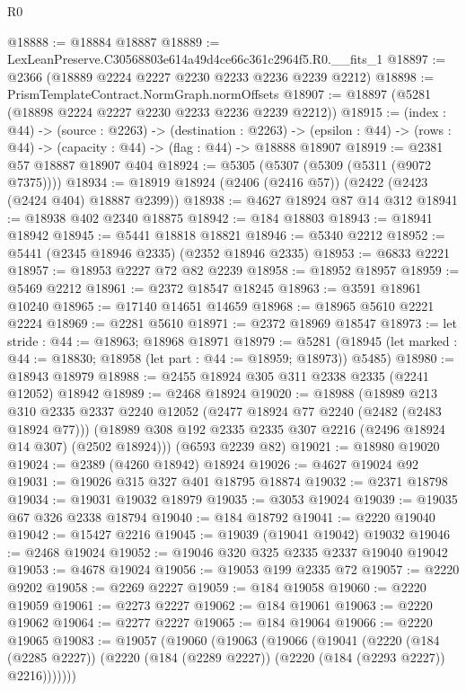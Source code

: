 \begin{lexlean}{R0}
\begin{coremodule}
@18888 := @18884 @18887
@18889 := LexLeanPreserve.C30568803e614a49d4ce66c361c2964f5.R0.__fits_1
@18897 := @2366 (@18889 @2224 @2227 @2230 @2233 @2236 @2239 @2212)
@18898 := PrismTemplateContract.NormGraph.normOffsets
@18907 := @18897 (@5281 (@18898 @2224 @2227 @2230 @2233 @2236 @2239 @2212))
@18915 := (index : @44) ->
  (source : @2263) ->
  (destination : @2263) ->
  (epsilon : @44) -> (rows : @44) -> (capacity : @44) -> (flag : @44) -> @18888 @18907
@18919 := @2381 @57 @18887 @18907 @404
@18924 := @5305 (@5307 (@5309 (@5311 (@9072 @7375))))
@18934 := @18919 @18924 (@2406 (@2416 @57)) (@2422 (@2423 (@2424 @404) @18887 @2399))
@18938 := @4627 @18924 @87 @14 @312
@18941 := @18938 @402 @2340 @18875
@18942 := @184 @18803
@18943 := @18941 @18942
@18945 := @5441 @18818 @18821
@18946 := @5340 @2212
@18952 := @5441 (@2345 @18946 @2335) (@2352 @18946 @2335)
@18953 := @6833 @2221
@18957 := @18953 @2227 @72 @82 @2239
@18958 := @18952 @18957
@18959 := @5469 @2212
@18961 := @2372 @18547 @18245
@18963 := @3591 @18961 @10240
@18965 := @17140 @14651 @14659
@18968 := @18965 @5610 @2221 @2224
@18969 := @2281 @5610
@18971 := @2372 @18969 @18547
@18973 := let stride : @44 := @18963; @18968 @18971
@18979 := @5281
    (@18945 (let marked : @44 := @18830; @18958 (let part : @44 := @18959; @18973)) @5485)
@18980 := @18943 @18979
@18988 := @2455 @18924 @305 @311 @2338 @2335 (@2241 @12052) @18942
@18989 := @2468 @18924
@19020 := @18988
    (@18989
      @213
      @310
      @2335
      @2337
      @2240
      @12052
      (@2477 @18924 @77 @2240 (@2482 (@2483 @18924 @77)))
      (@18989 @308 @192 @2335 @2335 @307 @2216 (@2496 @18924 @14 @307) (@2502 @18924)))
    (@6593 @2239 @82)
@19021 := @18980 @19020
@19024 := @2389 (@4260 @18942) @18924
@19026 := @4627 @19024 @92
@19031 := @19026 @315 @327 @401 @18795 @18874
@19032 := @2371 @18798
@19034 := @19031 @19032 @18979
@19035 := @3053 @19024
@19039 := @19035 @67 @326 @2338 @18794
@19040 := @184 @18792
@19041 := @2220 @19040
@19042 := @15427 @2216
@19045 := @19039 (@19041 @19042) @19032
@19046 := @2468 @19024
@19052 := @19046 @320 @325 @2335 @2337 @19040 @19042
@19053 := @4678 @19024
@19056 := @19053 @199 @2335 @72
@19057 := @2220 @9202
@19058 := @2269 @2227
@19059 := @184 @19058
@19060 := @2220 @19059
@19061 := @2273 @2227
@19062 := @184 @19061
@19063 := @2220 @19062
@19064 := @2277 @2227
@19065 := @184 @19064
@19066 := @2220 @19065
@19083 := @19057
    (@19060
      (@19063
        (@19066
          (@19041
            (@2220
              (@184 (@2285 @2227))
              (@2220 (@184 (@2289 @2227)) (@2220 (@184 (@2293 @2227)) @2216)))))))

\end{coremodule}
\end{lexlean}
